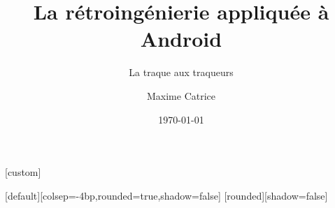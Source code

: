 \usepackage{graphics}
\usepackage{pifont}
\usepackage{ulem}
\usepackage{xcolor}
\usepackage{modifycolor}
\usepackage{lipsum}
\usepackage{fontspec}
\usepackage{caption}
\renewcommand{\figurename}{FIGURE}
\usepackage{tabularx}
\usepackage{tikz}
\usepackage{standalone}
\usepackage{svg}
\usepackage{multicol}
\usepackage{catchfilebetweentags}
\usepackage{xifthen}
\usetikzlibrary{arrows}
\usetikzlibrary{backgrounds}
\setmonofont[
  Contextuals={Alternate}
]{FuraCode Nerd Font}
\setsansfont{Roboto Medium}
\usepackage{pgfpages}


\usepackage[cache=false,outputdir=build]{minted}
      \renewcommand{\theFancyVerbLine}{\texttt{{{\arabic{FancyVerbLine}}}}}
\usepackage{adjustbox}
\usepackage{environ}%
\usepackage{tikz}
\usetikzlibrary{patterns}
\usepackage[french]{babel}
\usepackage{beamerthemesideblue}


[custom]

\title[]{La rétroingénierie appliquée à Android}
\subtitle{La traque aux traqueurs}
\author{Maxime Catrice}
\date{\today}

[default][colsep=-4bp,rounded=true,shadow=false]
[rounded][shadow=false]
\beamertemplatenavigationsymbolsempty

\newcommand{\nologo}{\setbeamertemplate{logo}{}}

\newcommand{\slidetitle}[1][]{
  \frametitle{\insertsection\ifthenelse{\equal{#1}{}}{}{: #1}}
}
\newcommand{\mono}[1]{
\texttt{#1}
}



